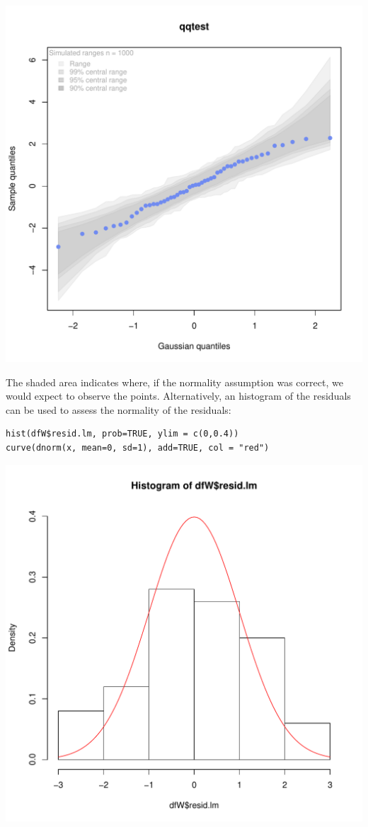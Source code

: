 \documentclass{article}
\begin{document}
\begin{center}
\includegraphics[width=.9\linewidth]{./figures/qqplot-lm.pdf}
\end{center}

The shaded area indicates where, if the normality assumption was
correct, we would expect to observe the points. Alternatively, an
histogram of the residuals can be used to assess the normality of the
residuals:
\lstset{language=r,label= ,caption= ,captionpos=b,numbers=none}
\begin{lstlisting}
hist(dfW$resid.lm, prob=TRUE, ylim = c(0,0.4))
curve(dnorm(x, mean=0, sd=1), add=TRUE, col = "red")
\end{lstlisting}

\begin{center}
\includegraphics[width=.9\linewidth]{./figures/hist-lm.pdf}
\end{center}
\end{document}
